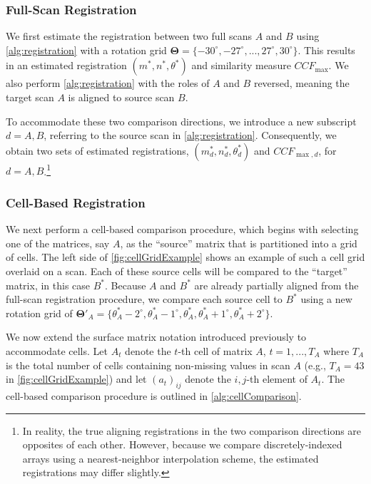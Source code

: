 \documentclass[reprint]{JASA}
\begin{document}
\hypertarget{full-scan-registration}{%
\subsubsection{Full-Scan Registration}\label{full-scan-registration}}

We first estimate the registration between two full scans \(A\) and
\(B\) using \autoref{alg:registration} with a rotation grid
\(\pmb{\Theta} = \{-30^\circ, -27^\circ,...,27^\circ,30^\circ\}\). This
results in an estimated registration \((m^*,n^*,\theta^*)\) and
similarity measure \(CCF_{\max}\). We also perform
\autoref{alg:registration} with the roles of \(A\) and \(B\) reversed,
meaning the target scan \(A\) is aligned to source scan \(B\).

To accommodate these two comparison directions, we introduce a new
subscript \(d = A,B\), referring to the source scan in
\autoref{alg:registration}. Consequently, we obtain two sets of
estimated registrations, \((m^*_d,n^*_d,\theta^*_d)\) and
\(CCF_{\max,d}\), for
\(d=A,B\).\footnote{In reality, the true aligning registrations in the two comparison directions are opposites of each other. However, because we compare discretely-indexed arrays using a nearest-neighbor interpolation scheme, the estimated registrations may differ slightly.}

\hypertarget{cell-based-registration}{%
\subsubsection{Cell-Based Registration}\label{cell-based-registration}}

We next perform a cell-based comparison procedure, which begins with
selecting one of the matrices, say \(A\), as the ``source'' matrix that
is partitioned into a grid of cells. The left side of
\autoref{fig:cellGridExample} shows an example of such a cell grid
overlaid on a scan. Each of these source cells will be compared to the
``target'' matrix, in this case \(B^*\). Because \(A\) and \(B^*\) are
already partially aligned from the full-scan registration procedure, we
compare each source cell to \(B^*\) using a new rotation grid of
\(\pmb{\Theta}'_A = \{\theta^*_A - 2^\circ, \theta^*_A - 1^\circ,\theta^*_A,\theta^*_A + 1^\circ,\theta^*_A + 2^\circ\}\).

We now extend the surface matrix notation introduced previously to
accommodate cells. Let \(A_{t}\) denote the \(t\)-th cell of matrix
\(A\), \(t = 1,...,T_A\) where \(T_A\) is the total number of cells
containing non-missing values in scan \(A\) (e.g., \(T_A = 43\) in
\autoref{fig:cellGridExample}) and let \((a_t)_{ij}\) denote the
\(i,j\)-th element of \(A_t\). The cell-based comparison procedure is
outlined in \autoref{alg:cellComparison}.
\end{document}
